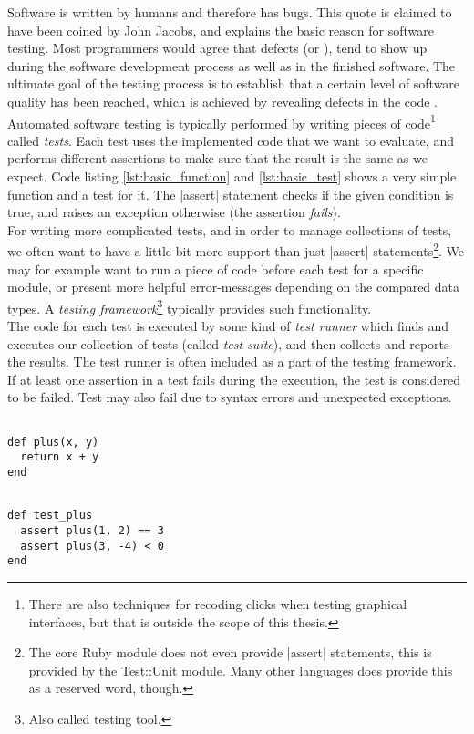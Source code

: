 \MakeShortVerb{\|}

Software is written by humans and therefore has bugs. This quote is
claimed to have been coined by John Jacobs\cite{web:quote_jacobs}, and
explains the basic reason for software testing. Most programmers would
agree that defects (or ), tend to show up
during the software development process as well as in the finished
software. The ultimate goal of the testing process is to establish that
a certain level of software quality has been reached, which is achieved
by revealing defects in the code \cite{book:adp}.\\

Automated software testing is typically performed by writing pieces of
code\footnote{There are also techniques for recoding clicks when testing
graphical interfaces, but that is outside the scope of this thesis.}
called \emph{tests}. Each test uses the implemented code that we want to
evaluate, and performs different assertions to make sure that the result
is the same as we expect. Code listing \ref{lst:basic_function} and
\ref{lst:basic_test} shows a very simple function and a test for it. The
|assert| statement checks if the given condition is true, and raises an
exception otherwise (the assertion \emph{fails}).\\

For writing more complicated tests, and in order to manage collections
of tests, we often want to have a little bit more support than just
|assert| statements\footnote{The core Ruby module does not even provide
|assert| statements, this is provided by the Test::Unit module. Many
other languages does provide this as a reserved word, though.}. We may
for example want to run a piece of code before each test for a specific
module, or present more helpful error-messages depending on the compared
data types. A \emph{testing framework}\footnote{Also called testing
tool.} typically provides such functionality.\\

The code for each test is executed by some kind of \emph{test runner}
which finds and executes our collection of tests (called \emph{test
suite}), and then collects and reports the results. The test runner is
often included as a part of the testing framework. If at least one
assertion in a test fails during the execution, the test is considered
to be failed. Test may also fail due to syntax errors and unexpected
exceptions.\\

\begin{lstlisting}[caption=An example function.,
                   label=lst:basic_function, float=t]

def plus(x, y)
  return x + y
end

\end{lstlisting}


\begin{lstlisting}[caption=A basic test for the function in code listing \ref{lst:basic_function}.,
                   label=lst:basic_test, float=t]

def test_plus
  assert plus(1, 2) == 3
  assert plus(3, -4) < 0
end

\end{lstlisting}
